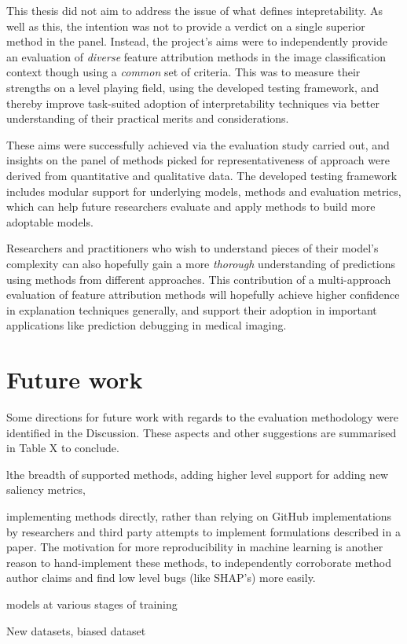 \documentclass[main]{subfiles}
\begin{document}
This thesis did not aim to address the issue of what defines intepretability. As well as this, the intention was not to provide a verdict on a single superior method in the panel. Instead, the project's aims were to independently provide an evaluation of \textit{diverse} feature attribution methods in the image classification context though using a \textit{common} set of criteria. This was to measure their strengths on a level playing field, using  the developed testing framework, and thereby improve task-suited adoption of interpretability techniques via better understanding of their practical merits and considerations.

These aims were successfully achieved via the evaluation study carried out, and insights on the panel of methods picked for representativeness of approach were derived from quantitative and qualitative data. The developed testing framework includes modular support for underlying models, methods and evaluation metrics, which can help future researchers evaluate and apply methods to build more adoptable models.

Researchers and practitioners who wish to understand pieces of their model's complexity can also hopefully gain a more \textit{thorough} understanding of predictions using methods from different approaches. This contribution of a multi-approach evaluation of feature attribution methods will hopefully achieve higher confidence in explanation techniques generally, and support their adoption in important applications like prediction debugging in medical imaging.

\section{Future work}

Some directions for future work with regards to the evaluation methodology were identified in the Discussion. These aspects and other suggestions are summarised in Table X to conclude.


lthe breadth of supported methods, adding higher level support for adding new saliency metrics, 

implementing methods directly, rather than relying on GitHub implementations by researchers and third party attempts to implement formulations described in a paper. The motivation for more reproducibility in machine learning is another reason to hand-implement these methods, to independently corroborate method author claims and find low level bugs (like SHAP's) more easily.

models at various stages of training

New datasets, biased dataset
\end{document}
